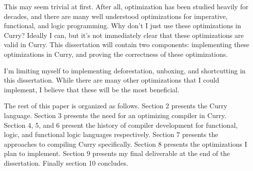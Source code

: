 This may seem trivial at first.  After all, optimization has been studied heavily for decades, and there are many well understood
optimizations for imperative, functional, and logic programming. 
\cite{optminzation_allen, dataflow_allen, LowryMedlock69, dataflow_kildall,
AhoUllman77, continuations_appel, compilers_appel, orbit, ssa_alpern, ssa_Wegman, ssa_wolfe,
steele78, stg-peytonJones, anormal_Flanagan, lambda_rename_steel, lambda_goto,
deforestation_wadler, shortcut_deforestation, haskell_inliner}
Why don't I just use these optimizations in Curry?
Ideally I can, but it's not immediately clear that these optimizations are valid in Curry.
This dissertation will contain two components: implementing these optimizations in Curry,
and proving the correctness of these optimizations.

I'm limiting myself to implementing deforestation, unboxing, and shortcutting in this dissertation.
While there are many other optimizations that I could implement, I believe that these will be the most beneficial.

The rest of this paper is organized as follows.
Section 2 presents the Curry language. Section 3 presents the need for an optimizing compiler in Curry.
Section 4, 5, and 6 present the history of compiler development for functional, logic, and functional logic languages respectively.
Section 7 presents the approaches to compiling Curry specifically.
Section 8 presents the optimizations I plan to implement.
Section 9 presents my final deliverable at the end of the dissertation.
Finally section 10 concludes.
